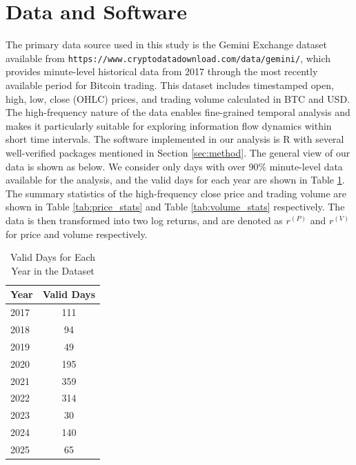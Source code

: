 \documentclass{elsarticle}
\begin{document}
\section{Data and Software}
The primary data source used in this study is the Gemini Exchange dataset available from \texttt{https://www.cryptodatadownload.com/data/gemini/}, which provides minute-level historical data from 2017 through the most recently available period for Bitcoin trading. This dataset includes timestamped open, high, low, close (OHLC) prices, and trading volume calculated in BTC and USD. The high-frequency nature of the data enables fine-grained temporal analysis and makes it particularly suitable for exploring information flow dynamics within short time intervals. The software implemented in our analysis is R with several well-verified packages mentioned in Section \ref{sec:method}. The general view of our data is shown as below. We consider only days with over 90\% minute-level data available for the analysis, and the valid days for each year are shown in Table \ref{tab01_valid_days}. The summary statistics of the high-frequency close price and trading volume are shown in Table \ref{tab:price_stats} and Table \ref{tab:volume_stats} respectively. The data is then transformed into two log returns, and are denoted as $r^{(P)}$ and $r^{(V)}$ for price and volume respectively.


\begin{table}[H]
  \caption{Valid Days for Each Year in the Dataset}
  \label{tab01_valid_days}
  \centering
  \begin{tabular}{lc}
    \hline\noalign{\smallskip}
    \textbf{Year} & \textbf{Valid Days} \\
    \hline\noalign{\smallskip}
    2017 & 111 \\
    2018 & 94 \\
    2019 & 49 \\
    2020 & 195 \\
    2021 & 359 \\
    2022 & 314 \\
    2023 & 30 \\
    2024 & 140 \\
    2025 & 65 \\
    \hline
  \end{tabular}
\end{table}
\end{document}

